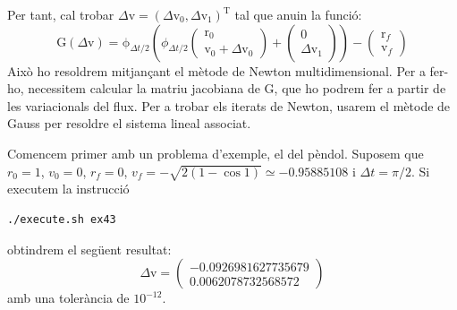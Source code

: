 \documentclass[10pt,a4paper]{article}
\newcommand{\vf}[1]{\boldsymbol{\mathrm{#1}}} %
\theoremstyle{definition}
\theoremstyle{remark}
\begin{document}
Per tant, cal trobar $\Delta\vf{v}={(\Delta\vf{v}_0,\Delta\vf{v}_1)}^\mathrm{T}$ tal que anu\lgem in la funció:
$$
  \vf{G}(\Delta\vf{v}) = \vf\phi_{\Delta t/2}\left(\phi_{\Delta t/2}\begin{pmatrix}
    \vf{r}_0 \\
    \vf{v}_0 + \Delta\vf{v}_0
  \end{pmatrix}+\begin{pmatrix}
    \vf{0} \\
    \Delta\vf{v}_1
  \end{pmatrix}\right) - \begin{pmatrix}
    \vf{r}_f \\
    \vf{v}_f
  \end{pmatrix}
$$
Això ho resoldrem mitjançant el mètode de Newton multidimensional. Per a fer-ho, necessitem calcular la matriu jacobiana de $\vf{G}$, que ho podrem fer a partir de les variacionals del flux. Per a trobar els iterats de Newton, usarem el mètode de Gauss per resoldre el sistema lineal associat.

Comencem primer amb un problema d'exemple, el del pèndol. Suposem que $r_0=1$, $v_0=0$, $r_f=0$, $v_f=-\sqrt{2(1-\cos 1)}
  \simeq -0.95885108$ i $\Delta t=\pi/2$. Si executem la instrucció
\begin{lstlisting}[language=Bash]
./execute.sh ex43
\end{lstlisting}
obtindrem el següent resultat:
$$
  \Delta\vf{v} = \begin{pmatrix}
    -0.0926981627735679 \\
    0.0062078732568572
  \end{pmatrix}
$$
amb una tolerància de $10^{-12}$.
\end{document}
